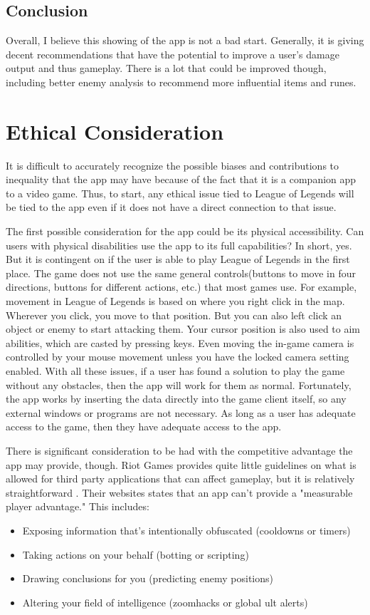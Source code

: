 \documentclass[10pt,twocolumn]{article}
\begin{document}
\subsection{Conclusion}
Overall, I believe this showing of the app is not a bad start.
Generally, it is giving decent recommendations that have the potential to improve a user's damage output and thus gameplay.
There is a lot that could be improved though, including better enemy analysis to recommend more influential items and runes.


\section{Ethical Consideration}
It is difficult to accurately recognize the possible biases and contributions to inequality that the app may have because of the fact that it is a companion app to a video game.
Thus, to start, any ethical issue tied to League of Legends will be tied to the app even if it does not have a direct connection to that issue.

The first possible consideration for the app could be its physical accessibility.
Can users with physical disabilities use the app to its full capabilities?
In short, yes.
But it is contingent on if the user is able to play League of Legends in the first place.
The game does not use the same general controls(buttons to move in four directions, buttons for different actions, etc.) that most games use.
For example, movement in League of Legends is based on where you right click in the map.
Wherever you click, you move to that position.
But you can also left click an object or enemy to start attacking them.
Your cursor position is also used to aim abilities, which are casted by pressing keys.
Even moving the in-game camera is controlled by your mouse movement unless you have the locked camera setting enabled.
With all these issues, if a user has found a solution to play the game without any obstacles, then the app will work for them as normal.
Fortunately, the app works by inserting the data directly into the game client itself, so any external windows or programs are not necessary.
As long as a user has adequate access to the game, then they have adequate access to the app.

There is significant consideration to be had with the competitive advantage the app may provide, though.
Riot Games provides quite little guidelines on what is allowed for third party applications that can affect gameplay, but it is relatively straightforward \cite{RiotGamesThirdPartyApplication}.
Their websites states that an app can't provide a "measurable player advantage."
This includes:
\begin{itemize}
    \item Exposing information that’s intentionally obfuscated (cooldowns or timers)
    \item Taking actions on your behalf (botting or scripting)
    \item Drawing conclusions for you (predicting enemy positions)
    \item Altering your field of intelligence (zoomhacks or global ult alerts)
\end{itemize}
\end{document}
